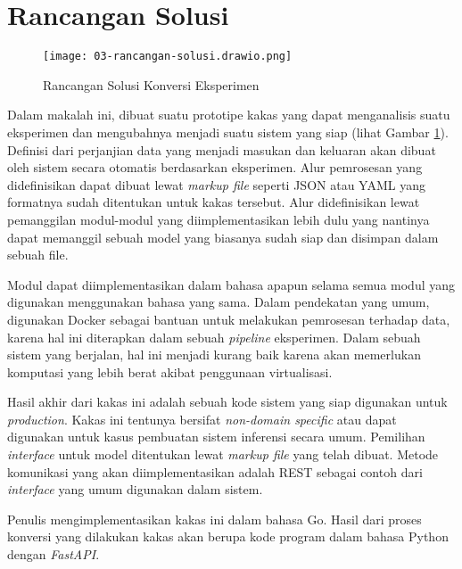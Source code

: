 \section{Rancangan Solusi}

\begin{figure}[ht]
  \centering
  \texttt{[image: 03-rancangan-solusi.drawio.png]}
  \caption{Rancangan Solusi Konversi Eksperimen}
  \label{fig:03-tool}
\end{figure}

Dalam makalah ini, dibuat suatu prototipe kakas yang dapat menganalisis suatu eksperimen dan mengubahnya menjadi suatu sistem yang siap (lihat Gambar \ref{fig:03-tool}).
Definisi dari perjanjian data yang menjadi masukan dan keluaran akan dibuat oleh sistem secara otomatis berdasarkan eksperimen.
Alur pemrosesan yang didefinisikan dapat dibuat lewat \textit{markup file} seperti JSON atau YAML yang formatnya sudah ditentukan untuk kakas tersebut.
Alur didefinisikan lewat pemanggilan modul-modul yang diimplementasikan lebih dulu yang nantinya dapat memanggil sebuah model yang biasanya sudah siap dan disimpan dalam sebuah file.

Modul dapat diimplementasikan dalam bahasa apapun selama semua modul yang digunakan menggunakan bahasa yang sama.
Dalam pendekatan yang umum, digunakan Docker sebagai bantuan untuk melakukan pemrosesan terhadap data, karena hal ini diterapkan dalam sebuah \textit{pipeline} eksperimen.
Dalam sebuah sistem yang berjalan, hal ini menjadi kurang baik karena akan memerlukan komputasi yang lebih berat akibat penggunaan virtualisasi.

Hasil akhir dari kakas ini adalah sebuah kode sistem yang siap digunakan untuk \textit{production}.
Kakas ini tentunya bersifat \textit{non-domain specific} atau dapat digunakan untuk kasus pembuatan sistem inferensi secara umum.
Pemilihan \textit{interface} untuk model ditentukan lewat \textit{markup file} yang telah dibuat.
Metode komunikasi yang akan diimplementasikan adalah REST sebagai contoh dari \textit{interface} yang umum digunakan dalam sistem.

Penulis mengimplementasikan kakas ini dalam bahasa Go.
Hasil dari proses konversi yang dilakukan kakas akan berupa kode program dalam bahasa Python dengan \textit{FastAPI}.

